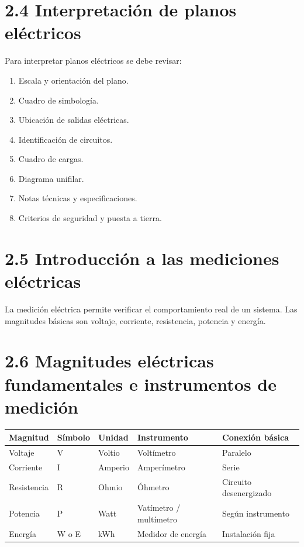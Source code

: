 \documentclass[
  spanish,
  letterpaper,
  DIV=11,
  numbers=noendperiod]{scrreprt}
\newcounter{none} %
\providecommand{\tightlist}{%
  \setlength{\itemsep}{0pt}\setlength{\parskip}{0pt}}
\begin{document}
\section{2.4 Interpretación de planos
eléctricos}\label{interpretaciuxf3n-de-planos-eluxe9ctricos}

Para interpretar planos eléctricos se debe revisar:

\begin{enumerate}
\def\labelenumi{\arabic{enumi}.}
\tightlist
\item
  Escala y orientación del plano.
\item
  Cuadro de simbología.
\item
  Ubicación de salidas eléctricas.
\item
  Identificación de circuitos.
\item
  Cuadro de cargas.
\item
  Diagrama unifilar.
\item
  Notas técnicas y especificaciones.
\item
  Criterios de seguridad y puesta a tierra.
\end{enumerate}

\section{2.5 Introducción a las mediciones
eléctricas}\label{introducciuxf3n-a-las-mediciones-eluxe9ctricas}

La medición eléctrica permite verificar el comportamiento real de un
sistema. Las magnitudes básicas son voltaje, corriente, resistencia,
potencia y energía.

\section{2.6 Magnitudes eléctricas fundamentales e instrumentos de
medición}\label{magnitudes-eluxe9ctricas-fundamentales-e-instrumentos-de-mediciuxf3n}

{\def\LTcaptype{none} %
\begin{longtable}[]{@{}lllll@{}}
\toprule\noalign{}
Magnitud & Símbolo & Unidad & Instrumento & Conexión básica \\
\midrule\noalign{}
\endhead
\bottomrule\noalign{}
\endlastfoot
Voltaje & V & Voltio & Voltímetro & Paralelo \\
Corriente & I & Amperio & Amperímetro & Serie \\
Resistencia & R & Ohmio & Óhmetro & Circuito desenergizado \\
Potencia & P & Watt & Vatímetro / multímetro & Según instrumento \\
Energía & W o E & kWh & Medidor de energía & Instalación fija \\
\end{longtable}
}
\end{document}
